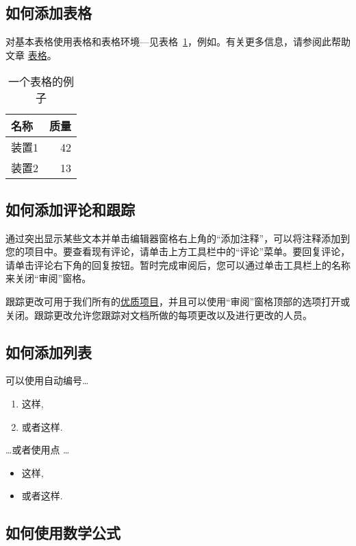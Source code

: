 \documentclass{article}
\begin{document}
\subsection{如何添加表格}
对基本表格使用表格和表格环境---见表格~\ref{tab:widgets}，例如。有关更多信息，请参阅此帮助文章 \href{https://www.overleaf.com/learn/latex/tables}{表格}。

\begin{table}
\centering
\begin{tabular}{l|r}%
名称 & 质量 \\\hline %
装置1 & 42 \\
装置2 & 13 
\end{tabular}
\caption{\label{tab:widgets}一个表格的例子}
\end{table}

\subsection{如何添加评论和跟踪}

通过突出显示某些文本并单击编辑器窗格右上角的“添加注释”，可以将注释添加到您的项目中。要查看现有评论，请单击上方工具栏中的“评论”菜单。要回复评论，请单击评论右下角的回复按钮。暂时完成审阅后，您可以通过单击工具栏上的名称来关闭“审阅”窗格。

跟踪更改可用于我们所有的\href{https://www.overleaf.com/user/subscription/plans}{优质项目}，并且可以使用“审阅”窗格顶部的选项打开或关闭。跟踪更改允许您跟踪对文档所做的每项更改以及进行更改的人员。

\subsection{如何添加列表}

可以使用自动编号\dots

\begin{enumerate}%
\item 这样,
\item 或者这样.
\end{enumerate}
\dots 或者使用点 \dots
\begin{itemize} %
\item 这样,
\item 或者这样.
\end{itemize}

\subsection{如何使用数学公式}
\end{document}
